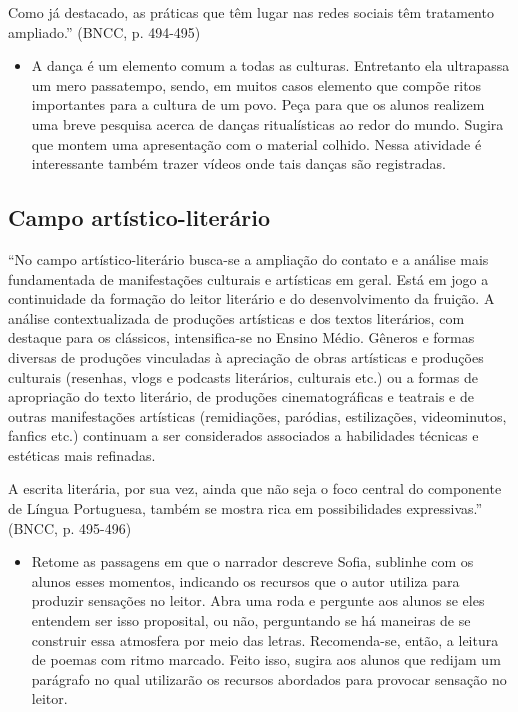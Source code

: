 \documentclass[12pt]{extarticle}
\begin{document}
Como já destacado, as práticas que têm lugar nas redes sociais têm
tratamento ampliado.'' (BNCC, p. 494-495)

\begin{itemize}
\item
  A dança é um elemento comum a todas as culturas. Entretanto ela
  ultrapassa um mero passatempo, sendo, em muitos casos elemento que
  compõe ritos importantes para a cultura de um povo. Peça para que os
  alunos realizem uma breve pesquisa acerca de danças ritualísticas ao
  redor do mundo. Sugira que montem uma apresentação com o material
  colhido. Nessa atividade é interessante também trazer vídeos onde tais
  danças são registradas.
\end{itemize}

\subsection{Campo artístico-literário}

``No campo artístico-literário busca-se a ampliação do contato e a
análise mais fundamentada de manifestações culturais e artísticas em
geral. Está em jogo a continuidade da formação do leitor literário e do
desenvolvimento da fruição. A análise contextualizada de produções
artísticas e dos textos literários, com destaque para os clássicos,
intensifica-se no Ensino Médio. Gêneros e formas diversas de produções
vinculadas à apreciação de obras artísticas e produções culturais
(resenhas, vlogs e podcasts literários, culturais etc.) ou a formas de
apropriação do texto literário, de produções cinematográficas e teatrais
e de outras manifestações artísticas (remidiações, paródias,
estilizações, videominutos, fanfics etc.) continuam a ser considerados
associados a habilidades técnicas e estéticas mais refinadas.

A escrita literária, por sua vez, ainda que não seja o foco central do
componente de Língua Portuguesa, também se mostra rica em possibilidades
expressivas.'' (BNCC, p. 495-496)

\begin{itemize}
\item
  Retome as passagens em que o narrador descreve Sofia, sublinhe com os
  alunos esses momentos, indicando os recursos que o autor utiliza para
  produzir sensações no leitor. Abra uma roda e pergunte aos alunos se
  eles entendem ser isso proposital, ou não, perguntando se há maneiras
  de se construir essa atmosfera por meio das letras. Recomenda-se,
  então, a leitura de poemas com ritmo marcado. Feito isso, sugira aos
  alunos que redijam um parágrafo no qual utilizarão os recursos
  abordados para provocar sensação no leitor.
\end{itemize}
\end{document}
